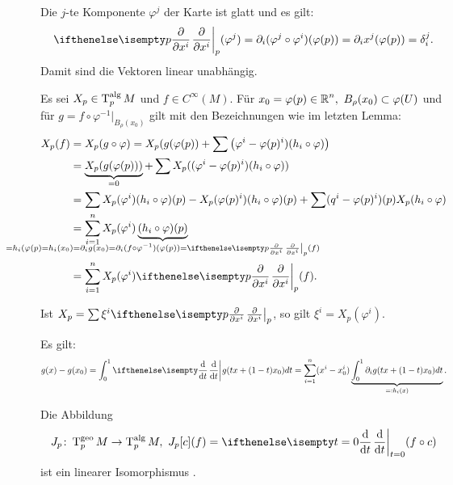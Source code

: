 \begin{bew}
Die $j$-te Komponente $\varphi^j$ der Karte ist glatt und es gilt:
\begin{align*}
	\pdifffrac[p]{}{x^i}(\varphi^j) = \partial_i(\varphi^j \circ \varphi^i)(\varphi(p)) = \partial_ix^j(\varphi(p)) = \delta_i^j.
\end{align*}
Damit sind die Vektoren linear unabhängig.

Es sei $X_p\in \operatorname{T}_p^{\text{alg}}M$ und $f \in C^{\infty}(M)$.
Für $x_0=\varphi(p) \in \operatorname{\mathbb{R}}^n, \ B_{\rho}(x_0) \subset \varphi(U)$ und für $g = f \circ \varphi^{-1}|_{B_{\rho}(x_0)}$ gilt mit den Bezeichnungen wie im letzten Lemma:
\begin{align*}
	X_p(f) & = X_p(g \circ \varphi) = X_p(g(\varphi(p)) + \sum \left(\varphi^i - \varphi(p)^i)(h_i \circ \varphi) \right)\\
	& = \underbrace{X_p(g(\varphi(p)))}_{\mathclap{=0}} + \sum X_p((\varphi^i-\varphi(p)^i)(h_i \circ \varphi))\\
	& = \sum X_p(\varphi^i)(h_i\circ\varphi)(p) - X_p(\varphi(p)^i)(h_i\circ \varphi)(p) + \sum (q^i-\varphi(p)^i)(p) X_p(h_i \circ \varphi)\\
	& = \sum_{i=1}^n X_p(\varphi^i)\underbrace{(h_i \circ \varphi)(p)}_{\mathclap{=h_i(\varphi(p) = h_i(x_0) = \partial_ig(x_0) = \partial_i(f\circ \varphi^{-1})(\varphi(p)) = \pdifffrac[p]{}{x^i}(f)}}\\
	& = \sum_{i=1}^nX_p(\varphi^i)\pdifffrac[p]{}{x^i}(f).
\end{align*}
\end{bew}

\begin{Bem}
  Ist $X_p=\sum \xi^i\pdifffrac[p]{}{x^i}$, so gilt $\xi^i = X_p(\varphi^i)$.
\end{Bem}

\begin{bew}
Es gilt:
\begin{align*}
	g(x) - g(x_0) = \int_0^1\difffrac{}{t}g(tx + (1-t)x_0)dt = \sum_{i=1}^n(x^i-x_0^i)\underbrace{\int_0^1\partial_ig(tx + (1-t)x_0) dt}_{=: h_i(x)}.
\end{align*}
\end{bew}

\begin{Satz}
  Die Abbildung
  \begin{align*}
    J_p \colon \T_p^{\text{geo}}M \to \T_p^{\text{alg}}M, \ J_{p}[c](f) = \difffrac[t=0]{}{t}(f\circ c)
  \end{align*}
  ist ein linearer \gls{Isomorphismus} .
\end{Satz}

